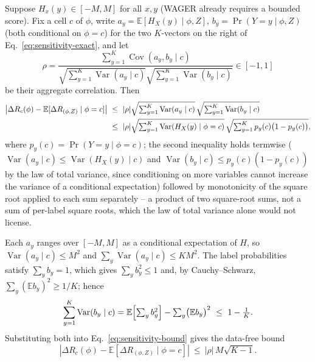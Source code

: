 \begin{proposition}\label{prop:sensitivity}
Suppose $H_x(y)\in[-M,M]$ for all $x,y$ (WAGER already requires a bounded score). Fix a
cell $c$ of $\phi$, write $a_y=\mathbb E[H_X(y)\mid\phi,Z]$, $b_y=\Pr(Y=y\mid\phi,Z)$
(both conditional on $\phi=c$) for the two $K$-vectors on the right of
Eq.~\eqref{eq:sensitivity-exact}, and let
\begin{equation}
\rho=\frac{\sum_{y=1}^K\operatorname{Cov}(a_y,b_y\mid c)}
{\sqrt{\sum_{y=1}^K\operatorname{Var}(a_y\mid c)}\sqrt{\sum_{y=1}^K\operatorname{Var}(b_y\mid c)}}
\in[-1,1]
\end{equation}
be their aggregate correlation. Then
\begin{align}
\left|\Delta R_c(\phi)-\mathbb E[\Delta R_{(\phi,Z)}\mid\phi=c]\right|
&\ \le\ |\rho|\sqrt{\textstyle\sum_{y=1}^K\operatorname{Var}(a_y\mid c)}\,
\sqrt{\textstyle\sum_{y=1}^K\operatorname{Var}(b_y\mid c)}\notag\\
&\ \le\ |\rho|\sqrt{\textstyle\sum_{y=1}^K\operatorname{Var}(H_X(y)\mid\phi=c)}\,
\sqrt{\textstyle\sum_{y=1}^Kp_y(c)\bigl(1-p_y(c)\bigr)},
\label{eq:sensitivity-bound}
\end{align}
where $p_y(c)=\Pr(Y=y\mid\phi=c)$; the second inequality holds termwise
($\operatorname{Var}(a_y\mid c)\le\operatorname{Var}(H_X(y)\mid c)$ and
$\operatorname{Var}(b_y\mid c)\le p_y(c)(1-p_y(c))$ by the law of total variance, since
conditioning on more variables cannot increase the variance of a conditional
expectation) followed by monotonicity of the square root applied to each sum
separately -- a product of two square-root sums, not a sum of per-label square roots,
which the law of total variance alone would not license.
\end{proposition}

\begin{corollary}\label{cor:sensitivity-crude}
Each $a_y$ ranges over $[-M,M]$ as a conditional expectation of $H$, so
$\operatorname{Var}(a_y\mid c)\le M^2$ and $\sum_y\operatorname{Var}(a_y\mid c)\le KM^2$.
The label probabilities satisfy $\sum_yb_y=1$, which gives $\sum_yb_y^2\le1$ and, by
Cauchy--Schwarz, $\sum_y(\mathbb E b_y)^2\ge1/K$; hence
\begin{equation}
\sum_{y=1}^K\operatorname{Var}(b_y\mid c)
=\mathbb E\Bigl[\textstyle\sum_yb_y^2\Bigr]-\sum_y\bigl(\mathbb E b_y\bigr)^2
\ \le\ 1-\frac1K .
\label{eq:simplex-var}
\end{equation}
Substituting both into Eq.~\eqref{eq:sensitivity-bound} gives the data-free bound
\begin{equation}
\left|\Delta R_c(\phi)-\mathbb E[\Delta R_{(\phi,Z)}\mid\phi=c]\right|
\ \le\ |\rho|\,M\sqrt{K-1}.
\label{eq:sensitivity-crude}
\end{equation}
\end{corollary}

